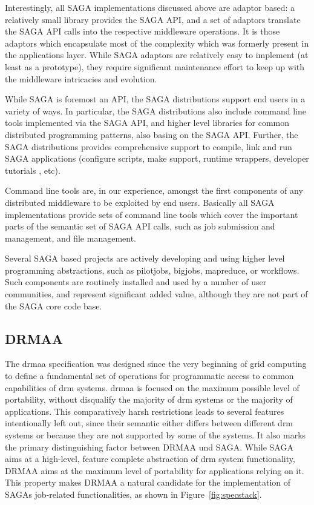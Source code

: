 \documentclass[twocolumn]{svjour3}       %
\begin{document}
Interestingly, all SAGA implementations discussed above are adaptor based: a relatively small library provides the SAGA API, and a set of adaptors translate the SAGA API calls into the respective middleware operations.  It is those adaptors which encapsulate most of the complexity which was formerly present in the applications layer.  While SAGA adaptors are relatively easy to implement (at least as a prototype), they require significant maintenance effort to keep up with the middleware intricacies and evolution.

While SAGA is foremost an API, the SAGA distributions support end users in a variety of ways.  In particular, the SAGA distributions also include command line tools implemented via the SAGA API, and higher level libraries for common distributed programming patterns, also basing on the SAGA API.  Further, the SAGA distributions provides comprehensive support to compile, link and run SAGA applications (configure scripts, make support, runtime wrappers, developer tutorials , etc).

Command line tools are, in our experience, amongst the first components of any distributed middleware to be exploited by end users.  Basically all SAGA implementations provide sets of command line tools which cover the important parts of the semantic set of SAGA API calls, such as job submission and management, and file management.

Several SAGA based projects are actively developing and using higher level programming abstractions, such as pilotjobs, bigjobs, mapreduce, or workflows.  Such components are routinely installed and used by a number of user communities, and represent significant added value, although they are not part of the SAGA core code base. 

\subsection{DRMAA}
\label{sec:drmaa}

The \gls{drmaa} specification was designed since the very beginning of grid computing to define a fundamental set of operations for programmatic access to common capabilities of \gls{drm} systems. \gls{drmaa} is focused on the maximum possible level of portability, without disqualify the majority of \gls{drm} systems or the majority of applications. This comparatively harsh restrictions leads to several features intentionally left out, since their semantic either differs between different \gls{drm} systems or because they are not supported by some of the systems. It also marks the primary distinguishing factor between DRMAA und SAGA. While SAGA aims at a high-level, feature complete abstraction of \gls{drm} system functionality, DRMAA aims at the maximum level of portability for applications relying on it. This property makes DRMAA a natural candidate for the implementation of SAGAs job-related functionalities, as shown in Figure~\ref{fig:specstack}. 
\end{document}
